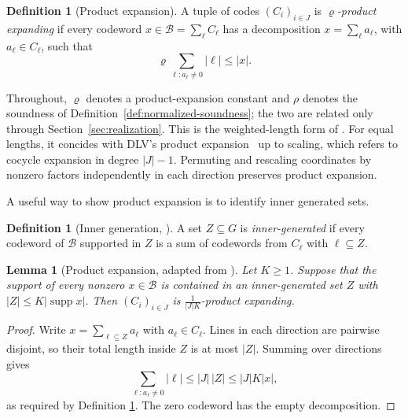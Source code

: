 \documentclass[11pt,letterpaper]{article}
\renewcommand{\le}{\leqslant}
\renewcommand{\ge}{\geqslant}
\newtheorem{lemma}[theorem]{Lemma}
\theoremstyle{definition}
\newtheorem{definition}[theorem]{Definition}
\theoremstyle{remark}
\newcommand{\cB}{\mathcal B}
\newcommand{\supp}{\operatorname{supp}}
\begin{document}
\begin{definition}[Product expansion]\label{def:product-expansion}
A tuple of codes $(C_i)_{i\in J}$ is \emph{$\varrho$-product expanding} if every
codeword $x\in \mathcal{B} = \sum_\ell C_\ell$ has a decomposition
$x=\sum_\ell a_\ell$, with $a_\ell\in C_\ell$, such that
\begin{equation}
 \varrho\sum_{\ell:a_\ell\ne0}|\ell|\le |x|.
 \label{eq:product-expansion}
\end{equation}
\end{definition}
Throughout, $\varrho$ denotes a product-expansion constant and $\rho$
denotes the soundness of Definition~\ref{def:normalized-soundness};
the two are related only through Section~\ref{sec:realization}.
This is the weighted-length form of
\cite[Definition~1]{KalachevPanteleev2025}. For equal lengths,
it concides with DLV's product expansion~\cite[Definition~5.12]{DinurLinVidick2024} up to scaling,
which refers to cocycle expansion in degree $|J|-1$.
Permuting and rescaling coordinates by nonzero factors independently
in each direction preserves product expansion.

A useful way to show product expansion is to identify inner generated sets.

\begin{definition}[Inner generation,
{\cite[Definition~5]{KalachevPanteleev2025}}]
\label{def:inner-generated}
A set $Z\subseteq G$ is \emph{inner-generated} if every codeword of
$\cB$ supported in $Z$ is a sum of codewords from $C_\ell$ with
$\ell\subseteq Z$.
\end{definition}


\begin{lemma}[Product expansion,
adapted from {\cite[proof of Lemma~19]{KalachevPanteleev2025}}]
\label{lem:inner-to-product}
Let $K\ge1$. Suppose that the support of every nonzero
$x\in\cB$ is contained in an inner-generated set $Z$ with
$|Z|\le K|\supp x|$. Then $(C_i)_{i\in J}$ is
$\frac1{|J|K}$-product expanding.
\end{lemma}
\begin{proof}
Write $x=\sum_{\ell\subseteq Z}a_\ell$ with $a_\ell\in C_\ell$.
Lines in each direction are pairwise disjoint, so their total
length inside $Z$ is at most $|Z|$. Summing over directions gives
\[
 \sum_{\ell:a_\ell\ne0}|\ell|
 \le |J|\,|Z|\le |J| K |x|,
\]
as required by Definition \ref{def:product-expansion}. The zero codeword has
the empty decomposition.
\end{proof}
\end{document}
